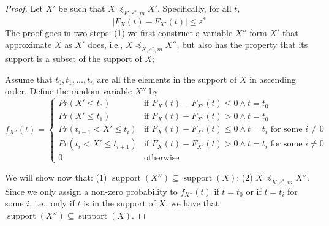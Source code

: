 \documentclass[review]{elsarticle}
\DeclareMathOperator{\support}{support}
\begin{document}
\begin{proof}
Let $X'$ be such that $X \preceq_{K,\varepsilon^*,m} X'$. Specifically, for all $t$,
\begin{equation}
|F_{X}(t)- F_{X'}(t)| \leq \varepsilon^*
\label{*}
\end{equation}
The proof goes in two steps: (1) we first construct a variable $X''$ form $X'$ that approximate $X$ as $X'$ does, i.e., $X \preceq_{K,\varepsilon^*,m} X''$, but also has the property that its support is a subset of the support of $X$; 

Assume that $t_0,t_1,\dots,t_n$ are all the elements in the support of $X$ in ascending order. Define the random variable $X''$ by 
$$
f_{X''}(t) = \begin{cases}
Pr(X' \leq t_0)           & \text{if } F_X(t)-F_{X'}(t)\leq 0 \wedge t= t_0\\ 
Pr(X' \leq t_1) 			& \text{if } F_X(t)-F_{X'}(t)>0 \wedge t= t_0\\
Pr(t_{i-1} < X' \leq t_i) & \text{if } F_X(t)-F_{X'}(t)\leq 0 \wedge t=t_i \text{ for some } i \neq 0 \\ 
Pr(t_{i} < X' \leq t_{i+1}) & \text{if } F_X(t)-F_{X'}(t)>0 \wedge t=t_i \text{ for some } i \neq 0 \\ 
0                         & \text{otherwise}
\end{cases}
$$

We will show now that: (1) $\support(X'') \subseteq \support(X)$; (2) $X \preceq_{K,\varepsilon^*,m} X''$.
Since we only assign a non-zero probability to $f_{X''}(t)$ if $t=t_0$ or if $t=t_i$ for some $i$, i.e., only if $t$ is in the support of $X$, we have that $\support(X'') \subseteq \support(X)$. 
\end{proof}
\end{document}
